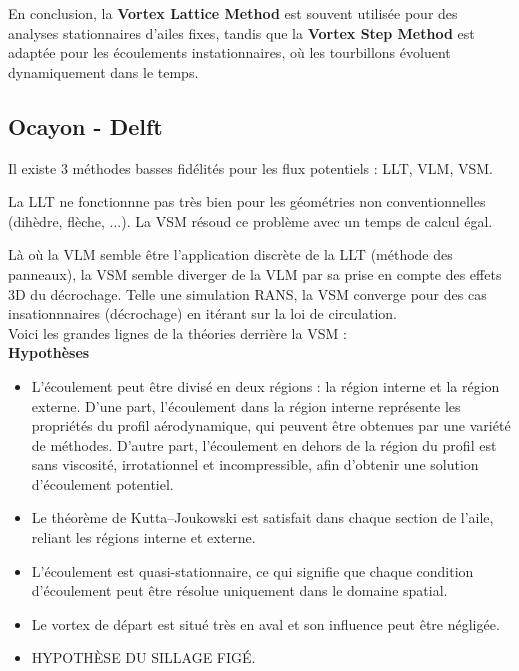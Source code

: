 \documentclass[conference]{IEEEtran}
\begin{document}
En conclusion, la \textbf{Vortex Lattice Method} est souvent utilisée pour des analyses stationnaires d'ailes fixes, tandis que la \textbf{Vortex Step Method} est adaptée pour les écoulements instationnaires, où les tourbillons évoluent dynamiquement dans le temps.

\subsection{\textbf{Ocayon - Delft}} 
Il existe 3 méthodes basses fidélités pour les flux potentiels : LLT, VLM, VSM.

La LLT ne fonctionnne pas très bien pour les géométries non conventionnelles (dihèdre, flèche, ...). La VSM résoud ce problème avec un temps de calcul égal.

Là où la VLM semble être l'application discrète de la LLT (méthode des panneaux), la VSM semble diverger de la VLM par sa prise en compte des effets 3D du décrochage. Telle une simulation RANS, la VSM converge pour des cas insationnnaires (décrochage) en itérant sur la loi de circulation. \\

Voici les grandes lignes de la théories derrière la VSM : \\

\textbf{Hypothèses} \\
\begin{itemize}
    \item L'écoulement peut être divisé en deux régions : la région interne et la région externe. D'une part, l'écoulement dans la région interne représente les propriétés du profil aérodynamique, qui peuvent être obtenues par une variété de méthodes. D'autre part, l'écoulement en dehors de la région du profil est sans viscosité, irrotationnel et incompressible, afin d'obtenir une solution d'écoulement potentiel.
    \item Le théorème de Kutta–Joukowski est satisfait dans chaque section de l'aile, reliant les régions interne et externe.
    \item L'écoulement est quasi-stationnaire, ce qui signifie que chaque condition d'écoulement peut être résolue uniquement dans le domaine spatial.
    \item Le vortex de départ est situé très en aval et son influence peut être négligée.
    \item HYPOTHÈSE DU SILLAGE FIGÉ.
\end{itemize}
\end{document}
